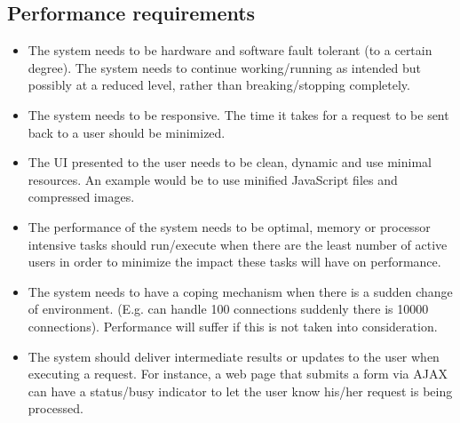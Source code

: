 \documentclass[a4paper,12pt,titlepage]{article}
\begin{document}
\subsection{Performance requirements}
\begin{itemize}
	\item The system needs to be hardware and software fault tolerant (to a certain degree). The system needs to continue working/running as intended but possibly at a reduced level, rather than breaking/stopping completely.
	\item The system needs to be responsive. The time it takes for a request to be sent back to a user should be minimized. 
	\item The UI presented to the user needs to be clean, dynamic and use minimal resources. An example would be to use minified JavaScript files and compressed images.
	\item The performance of the system needs to be optimal, memory or processor intensive tasks should run/execute when there are the least number of active users in order to minimize the impact these tasks will have on performance.
	\item The system needs to have a coping mechanism when there is a sudden change of environment. (E.g. can handle 100 connections suddenly there is 10000 connections). Performance will suffer if this is not taken into consideration.
	\item The system should deliver intermediate results or updates to the user when executing a request. For instance, a web page that submits a form via AJAX can have a status/busy indicator to let the user know his/her request is being processed.
\end{itemize}
\end{document}
